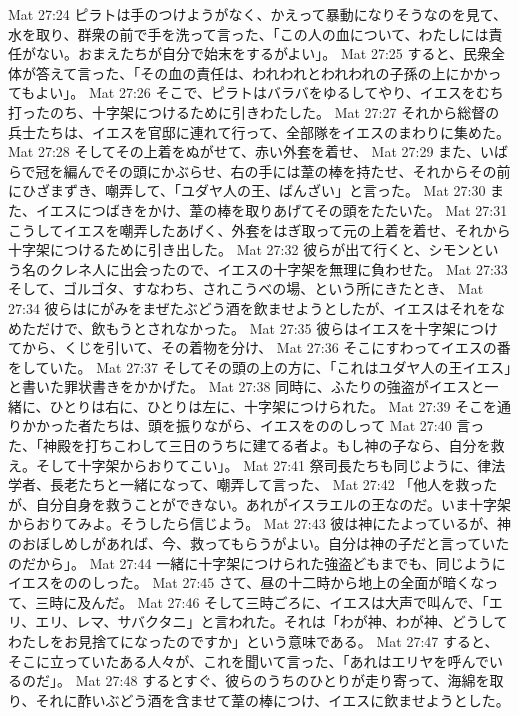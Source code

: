 Mat 27:24  ピラトは手のつけようがなく、かえって暴動になりそうなのを見て、水を取り、群衆の前で手を洗って言った、「この人の血について、わたしには責任がない。おまえたちが自分で始末をするがよい」。
Mat 27:25  すると、民衆全体が答えて言った、「その血の責任は、われわれとわれわれの子孫の上にかかってもよい」。
Mat 27:26  そこで、ピラトはバラバをゆるしてやり、イエスをむち打ったのち、十字架につけるために引きわたした。
Mat 27:27  それから総督の兵士たちは、イエスを官邸に連れて行って、全部隊をイエスのまわりに集めた。
Mat 27:28  そしてその上着をぬがせて、赤い外套を着せ、
Mat 27:29  また、いばらで冠を編んでその頭にかぶらせ、右の手には葦の棒を持たせ、それからその前にひざまずき、嘲弄して、「ユダヤ人の王、ばんざい」と言った。
Mat 27:30  また、イエスにつばきをかけ、葦の棒を取りあげてその頭をたたいた。
Mat 27:31  こうしてイエスを嘲弄したあげく、外套をはぎ取って元の上着を着せ、それから十字架につけるために引き出した。
Mat 27:32  彼らが出て行くと、シモンという名のクレネ人に出会ったので、イエスの十字架を無理に負わせた。
Mat 27:33  そして、ゴルゴタ、すなわち、されこうべの場、という所にきたとき、
Mat 27:34  彼らはにがみをまぜたぶどう酒を飲ませようとしたが、イエスはそれをなめただけで、飲もうとされなかった。
Mat 27:35  彼らはイエスを十字架につけてから、くじを引いて、その着物を分け、
Mat 27:36  そこにすわってイエスの番をしていた。
Mat 27:37  そしてその頭の上の方に、「これはユダヤ人の王イエス」と書いた罪状書きをかかげた。
Mat 27:38  同時に、ふたりの強盗がイエスと一緒に、ひとりは右に、ひとりは左に、十字架につけられた。
Mat 27:39  そこを通りかかった者たちは、頭を振りながら、イエスをののしって
Mat 27:40  言った、「神殿を打ちこわして三日のうちに建てる者よ。もし神の子なら、自分を救え。そして十字架からおりてこい」。
Mat 27:41  祭司長たちも同じように、律法学者、長老たちと一緒になって、嘲弄して言った、
Mat 27:42  「他人を救ったが、自分自身を救うことができない。あれがイスラエルの王なのだ。いま十字架からおりてみよ。そうしたら信じよう。
Mat 27:43  彼は神にたよっているが、神のおぼしめしがあれば、今、救ってもらうがよい。自分は神の子だと言っていたのだから」。
Mat 27:44  一緒に十字架につけられた強盗どもまでも、同じようにイエスをののしった。
Mat 27:45  さて、昼の十二時から地上の全面が暗くなって、三時に及んだ。
Mat 27:46  そして三時ごろに、イエスは大声で叫んで、「エリ、エリ、レマ、サバクタニ」と言われた。それは「わが神、わが神、どうしてわたしをお見捨てになったのですか」という意味である。
Mat 27:47  すると、そこに立っていたある人々が、これを聞いて言った、「あれはエリヤを呼んでいるのだ」。
Mat 27:48  するとすぐ、彼らのうちのひとりが走り寄って、海綿を取り、それに酢いぶどう酒を含ませて葦の棒につけ、イエスに飲ませようとした。
